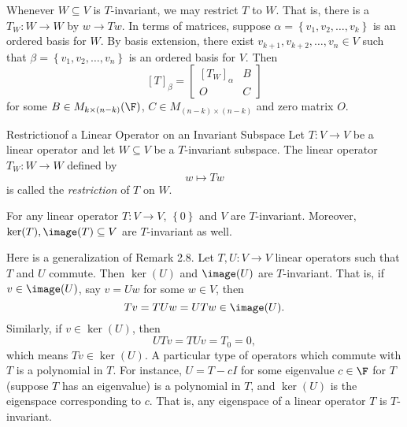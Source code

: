 \documentclass[linearalgebraII]{subfiles}
\begin{document}
    \begin{remark}
        Whenever $W\subseteq V$ is $T$-invariant, we may restrict $T$ to $W$. That is, there is a $T_W:W\to W$ by $w\to Tw$. In terms of matrices, suppose $\alpha = \left\lbrace v_1, v_2, \ldots, v_k \right\rbrace$ is an ordered basis for $W$. By basis extension, there exist $v_{k+1}, v_{k+2}, \ldots, v_n\in V$ such that $\beta = \left\lbrace v_1, v_2, \ldots, v_n \right\rbrace$ is an ordered basis for $V$. Then
        \begin{equation*}
            \left[ T \right]_\beta = \begin{bmatrix} \left[ T_W \right] _\alpha & B \\ O & C \end{bmatrix}
        \end{equation*}
        for some $B\in M_{k\times (n-k)}(\F)$, $C\in M_{(n-k)\times (n-k)}$ and zero matrix $O$.
    \end{remark}

    \begin{definition}{Restriction}{of a Linear Operator on an Invariant Subspace}
        Let $T:V\to V$ be a linear operator and let $W\subseteq V$ be a $T$-invariant subspace. The linear operator $T_W:W\to W$ defined by
        \begin{equation*}
            w\mapsto Tw
        \end{equation*}
        is called the \emph{restriction} of $T$ on $W$.
    \end{definition}

    \begin{remark}
        For any linear operator $T:V\to V$, $\left\lbrace 0 \right\rbrace$ and $V$ are $T$-invariant. Moreover, $\ker(T), \image(T)\subseteq V$ are $T$-invariant as well.
    \end{remark}

    \begin{remark}
        Here is a generalization of Remark 2.8. Let $T, U:V\to V$ linear operators such that $T$ and $U$ commute. Then $\ker(U)$ and $\image(U)$ are $T$-invariant. That is, if $v\in\image(U)$, say $v=Uw$ for some $w\in V$, then
        \begin{equation*}
            Tv = TUw = UTw \in\image(U).
        \end{equation*}
        Similarly, if $v\in\ker(U)$, then
        \begin{equation*}
            UTv = TUv = T_0 = 0,
        \end{equation*}
        which means $Tv\in\ker(U)$. A particular type of operators which commute with $T$ is a polynomial in $T$. For instance, $U = T-cI$ for some eigenvalue $c\in\F$ for $T$ (suppose $T$ has an eigenvalue) is a polynomial in $T$, and $\ker(U)$ is the eigenspace corresponding to $c$. That is, any eigenspace of a linear operator $T$ is $T$-invariant.
    \end{remark}
\end{document}
